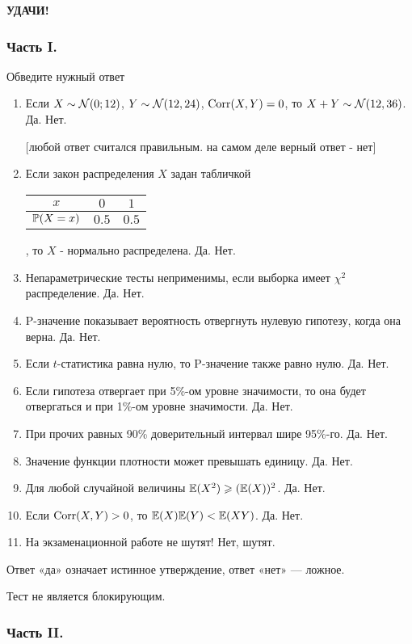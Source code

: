 \textbf{УДАЧИ!}

\subsubsection*{Часть I.}

Обведите нужный ответ

\begin{enumerate}
\item Если $X\sim \cN(0;12)$, $Y\sim \cN(12,24)$, $\Corr(X,Y)=0$, то
$X+Y\sim \cN(12,36)$.
Да. Нет.

$[$любой ответ считался правильным. на самом деле верный ответ -
нет$]$

\item Если закон распределения $X$ задан табличкой

\begin{tabular}{@{}ccc@{}}
\toprule
$x$      & $0$   & $1$   \\ \midrule
$\P(X=x)$ & $0.5$ & $0.5$ \\ \bottomrule
\end{tabular}, то $X$ - нормально распределена. Да. Нет.

\item Непараметрические тесты неприменимы, если выборка имеет
$\chi^{2}$ распределение. Да. Нет.
\item P-значение показывает вероятность отвергнуть нулевую
гипотезу, когда она верна. Да. Нет.
\item Если $t$-статистика равна нулю, то P-значение также равно
нулю. Да. Нет.
\item Если гипотеза отвергает при 5\%-ом уровне значимости, то
она будет отвергаться и при 1\%-ом уровне значимости. Да. Нет.
\item При прочих равных 90\% доверительный интервал шире 95\%-го. Да. Нет.
\item Значение функции плотности может превышать единицу. Да. Нет.
\item Для любой случайной величины  $\E(X^{2} )\ge
(\E(X))^{2}$. Да. Нет.
\item Если $\Corr(X,Y)>0$, то $\E(X)\E(Y)<\E(XY)$. Да. Нет.
\item На экзаменационной работе не шутят! Нет, шутят.
\end{enumerate}

Ответ «да» означает истинное утверждение, ответ «нет» — ложное.

Тест не является блокирующим.


\subsubsection*{Часть II.}

